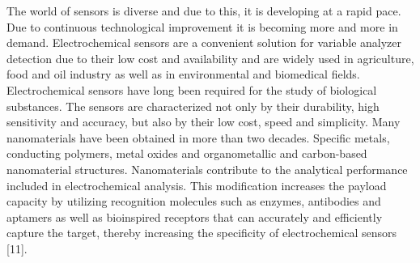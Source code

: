 \begin{multicols}{2}
The world of sensors is diverse and due to this, it is developing
at a rapid pace. Due to continuous technological improvement it is
becoming more and more in demand. Electrochemical sensors are a
convenient solution for variable analyzer detection due to their
low cost and availability and are widely used in agriculture,
food and oil industry as well as in environmental and biomedical
fields. Electrochemical sensors have long been required for the
study of biological substances. The sensors are characterized
not only by their durability, high sensitivity and accuracy,
but also by their low cost, speed and simplicity. Many
nanomaterials have been obtained in more than two decades.
Specific metals, conducting polymers, metal oxides and
organometallic and carbon-based nanomaterial structures.
Nanomaterials contribute to the analytical performance included in
electrochemical analysis. This modification increases the payload
capacity by utilizing recognition molecules such as enzymes,
antibodies and aptamers as well as bioinspired receptors that
can accurately and efficiently capture the target, thereby
increasing the specificity of electrochemical sensors {[}11{]}.
\end{multicols}

